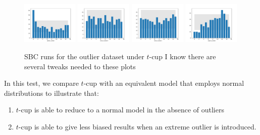 \documentclass[fleqn,usenatbib]{mnras}
\begin{document}
\begin{figure}
    \includegraphics[width=0.24\textwidth]{graphics/sbc_outlier_tcup/alpha_scaled.pdf}
    \includegraphics[width=0.24\textwidth]{graphics/sbc_outlier_tcup/beta_scaled.0.pdf}
    \includegraphics[width=0.24\textwidth]{graphics/sbc_outlier_tcup/beta_scaled.1.pdf}
    \includegraphics[width=0.24\textwidth]{graphics/sbc_outlier_tcup/sigma_scaled.pdf}
    \caption{SBC runs for the outlier dataset under $t$-cup {\color{red} I know
    there are several tweaks needed to these plots}}
    \label{fig:results.t.sbc}
\end{figure}

In this test, we compare $t$-cup with an equivalent model that employs normal
distributions to illustrate that:
\begin{enumerate}
    \item $t$-cup is able to reduce to a normal model in the absence of outliers
    \item $t$-cup is able to give less biased results when an extreme outlier is
          introduced.
\end{enumerate}
\end{document}
